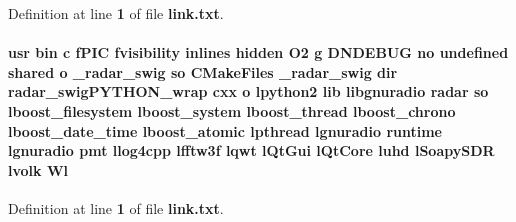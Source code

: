 Definition at line {\bf 1} of file {\bf link.\+txt}.

\paragraph[{Wl}]{\setlength{\rightskip}{0pt plus 5cm}usr bin {\bf c} f\+P\+IC fvisibility inlines hidden O2 g D\+N\+D\+E\+B\+UG no undefined shared o \+\_\+radar\+\_\+swig {\bf so} C\+Make\+Files \+\_\+radar\+\_\+swig dir radar\+\_\+swig\+P\+Y\+T\+H\+O\+N\+\_\+wrap cxx o lpython2 lib libgnuradio {\bf radar} {\bf so} lboost\+\_\+filesystem lboost\+\_\+system lboost\+\_\+thread lboost\+\_\+chrono lboost\+\_\+date\+\_\+time lboost\+\_\+atomic lpthread lgnuradio {\bf runtime} lgnuradio {\bf pmt} llog4cpp lfftw3f lqwt l\+Qt\+Gui l\+Qt\+Core {\bf luhd} l\+Soapy\+S\+DR lvolk Wl}\label{gr-radar-dev_2build_2swig_2CMakeFiles_2__radar__swig_8dir_2link_8txt_af7da9d76c5b3c726a2c8ee1338d9258b}


Definition at line {\bf 1} of file {\bf link.\+txt}.


